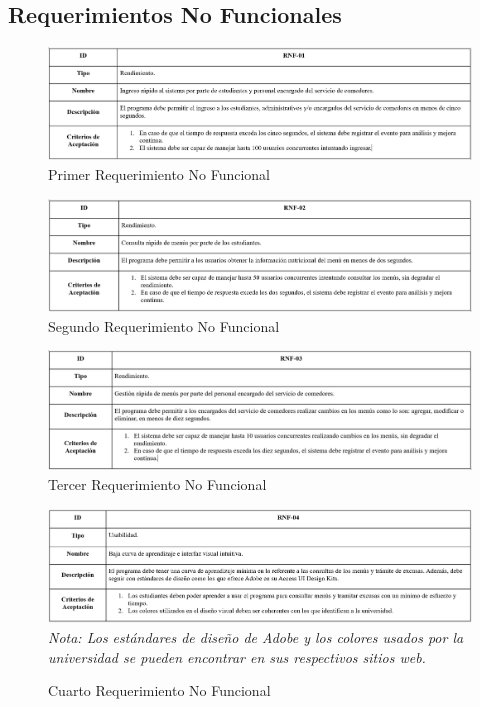 \documentclass[stu, 12pt, letterpaper, donotrepeattitle, floatsintext, natbib]{apa7}
\begin{document}
\newpage
\subsection{Requerimientos No Funcionales}

\begin{figure}[H]
	\caption[]{Primer Requerimiento No Funcional}
	\label{Primer Requerimiento No Funcional}
	\includegraphics[width=1\linewidth]{Requerimientos No Funcionales/1. Requerimiento No Funcional.png}
\end{figure}

\begin{figure}[H]
	\caption[]{Segundo Requerimiento No Funcional}
	\label{Segundo Requerimiento No Funcional}
	\includegraphics[width=1\linewidth]{Requerimientos No Funcionales/2. Requerimiento No Funcional.png}
\end{figure}

\begin{figure}[H]
	\caption[]{Tercer Requerimiento No Funcional}
	\label{Tercer Requerimiento No Funcional}
	\includegraphics[width=1\linewidth]{Requerimientos No Funcionales/3. Requerimiento No Funcional.png}
\end{figure}

\begin{figure}[H]
	\caption[]{Cuarto Requerimiento No Funcional}
	\label{Cuarto Requerimiento No Funcional}
	\includegraphics[width=1\linewidth]{Requerimientos No Funcionales/4. Requerimiento No Funcional.png}
	\textit{Nota: Los estándares de diseño de Adobe y los colores usados por la universidad se pueden encontrar en sus respectivos sitios web.}
\end{figure}
\end{document}

